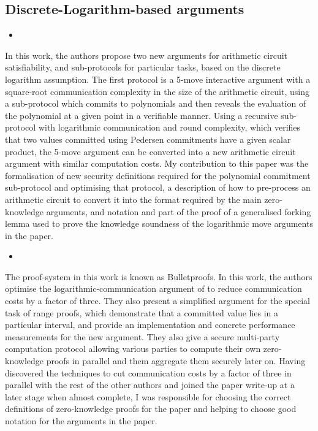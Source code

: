 \subsection*{Discrete-Logarithm-based arguments}

\begin{itemize}
\item {}
\end{itemize}

In this work, the authors propose two new arguments for arithmetic circuit satisfiability, and sub-protocols for particular tasks, based on the discrete logarithm assumption. The first protocol is a 5-move interactive argument with a square-root communication complexity in the size of the arithmetic circuit, using a sub-protocol which commits to polynomials and then reveals the evaluation of the polynomial at a given point in a verifiable manner. Using a recursive sub-protocol with logarithmic communication and round complexity, which verifies that two values committed using Pedersen commitments have a given scalar product, the 5-move argument can be converted into a new arithmetic circuit argument with similar computation costs. My contribution to this paper was the formalisation of new security definitions required for the polynomial commitment sub-protocol and optimising that protocol, a description of how to pre-process an arithmetic circuit to convert it into the format required by the main zero-knowledge arguments, and notation and part of the proof of a generalised forking lemma used to prove the knowledge soundness of the logarithmic move arguments in the paper.

\begin{itemize}
\item {}
\end{itemize}

The proof-system in this work is known as Bulletproofs. In this work, the authors optimise the logarithmic-communication argument of \cite{BootleCCGP16} to reduce communication costs by a factor of three. They also present a simplified argument for the special task of range proofs, which demonstrate that a committed value lies in a particular interval, and provide an implementation and concrete performance measurements for the new argument. They also give a secure multi-party computation protocol allowing various parties to compute their own zero-knowledge proofs in parallel and them aggregate them securely later on. Having discovered the techniques to cut communication costs by a factor of three in parallel with the rest of the other authors and joined the paper write-up at a later stage when almost complete, I was responsible for choosing the correct definitions of zero-knowledge proofs for the paper and helping to choose good notation for the arguments in the paper.

